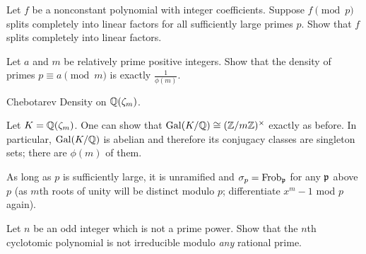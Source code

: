\begin{problem}
	Let $f$ be a nonconstant polynomial with integer coefficients.
	Suppose $f \pmod p$ splits completely into linear factors
	for all sufficiently large primes $p$.
	Show that $f$ splits completely into linear factors.
\end{problem}

\begin{dproblem}
	Let $a$ and $m$ be relatively prime positive integers.
	Show that the density of primes $p \equiv a \pmod m$ is exactly $\frac{1}{\phi(m)}$.
	\begin{hint}
		Chebotarev Density on $\mathbb Q(\zeta_m)$.
	\end{hint}
	\begin{sol}
		Let $K = \mathbb Q(\zeta_m)$.
		One can show that $\operatorname{Gal}(K/\mathbb Q) \cong (\mathbb Z/m\mathbb Z)^\times$ exactly as before.
		In particular, $\operatorname{Gal}(K/\mathbb Q)$ is abelian and therefore its conjugacy classes
		are singleton sets; there are $\phi(m)$ of them.

		As long as $p$ is sufficiently large, it is unramified
		and $\sigma_p = \mathrm{Frob}_\mathfrak p$ for any $\mathfrak p$ above $p$
		(as $m$th roots of unity will be distinct modulo $p$;
		differentiate $x^m-1$ mod $p$ again).
	\end{sol}
\end{dproblem}

\begin{problem}
	Let $n$ be an odd integer which is not a prime power.
	Show that the $n$th cyclotomic polynomial is not
	irreducible modulo \emph{any} rational prime.
\end{problem}


